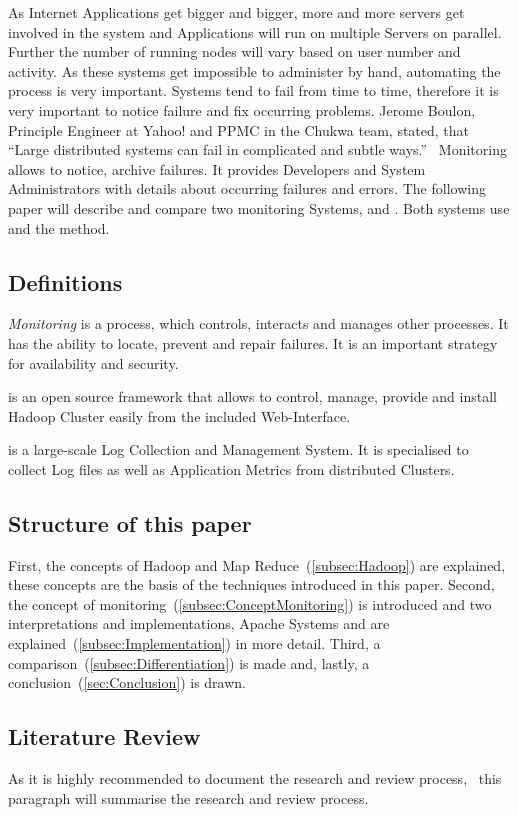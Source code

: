 As Internet Applications get bigger and bigger, more and more servers get involved in the system and Applications will run on multiple Servers on parallel. Further the number of running nodes will vary based on user number and activity. As these systems get impossible to administer by hand, automating the process is very important. Systems tend to fail from time to time, therefore it is very important to notice failure and fix occurring problems. Jerome Boulon, Principle Engineer at Yahoo! and PPMC in the Chukwa team, stated, that ``Large distributed systems can fail in complicated and subtle ways.''~\cite{Boulonb} Monitoring allows to notice, archive failures. It provides Developers and System Administrators with details about occurring failures and errors. The following paper will describe and compare two monitoring Systems, \amb and \chuk. Both systems use \hadoop and the \mr method.


\subsection{Definitions}

\textit{Monitoring} is a process, which controls, interacts and manages other processes. It has the ability to locate, prevent and repair failures. It is an important strategy for availability and security.

\amb is an open source framework that allows to control, manage, provide and install Hadoop Cluster easily from the included Web-Interface.

\chuk is a large-scale Log Collection and Management System. It is specialised to collect Log files as well as Application Metrics from distributed Clusters.

\subsection{Structure of this paper}
First, the concepts of Hadoop and Map Reduce~(\ref{subsec:Hadoop}) are explained, these concepts are the basis of the techniques introduced in this paper. 
Second, the concept of monitoring~(\ref{subsec:ConceptMonitoring}) is introduced and two interpretations and implementations, Apache Systems \amb and \chuk are explained~(\ref{subsec:Implementation}) in more detail. 
Third, a comparison~(\ref{subsec:Differentiation}) is made and, lastly, a conclusion~(\ref{sec:Conclusion}) is drawn.

\subsection{Literature Review}
As it is highly recommended to document the research and review process,~\cite{brocke09} this paragraph will summarise the research and review process.

